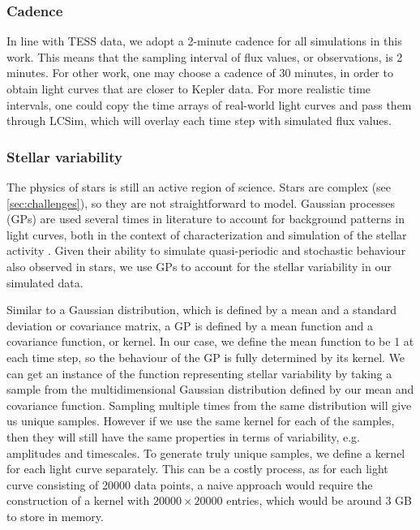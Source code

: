 \subsubsection{Cadence}
In line with TESS data, we adopt a 2-minute cadence for all simulations in this work. This means that the sampling interval of flux values, or observations, is 2 minutes. For other work, one may choose a cadence of 30 minutes, in order to obtain light curves that are closer to Kepler data. For more realistic time intervals, one could copy the time arrays of real-world light curves and pass them through LCSim, which will overlay each time step with simulated flux values.

\subsubsection{Stellar variability}


The physics of stars is still an active region of science. Stars are complex (see \ref{sec:challenges}), so they are not straightforward to model. Gaussian processes (GPs) are used several times in literature to account for background patterns in light curves, both in the context of characterization and simulation of the stellar activity \citep{barros2020improving, zucker2018shallow}. Given their ability to simulate quasi-periodic and stochastic behaviour also observed in stars, we use GPs to account for the stellar variability in our simulated data.

Similar to a Gaussian distribution, which is defined by a mean and a standard deviation or covariance matrix, a GP is defined by a mean function and a covariance function, or kernel. In our case, we define the mean function to be 1 at each time step, so the behaviour of the GP is fully determined by its kernel. We can get an instance of the function representing stellar variability by taking a sample from the multidimensional Gaussian distribution defined by our mean and covariance function. Sampling multiple times from the same distribution will give us unique samples. However if we use the same kernel for each of the samples, then they will still have the same properties in terms of variability, e.g. amplitudes and timescales. To generate truly unique samples, we define a kernel for each light curve separately. This can be a costly process, as for each light curve consisting of 20000 data points, a naive approach would require the construction of a kernel with $20000 \times 20000$ entries, which would be around 3 GB to store in memory. 

